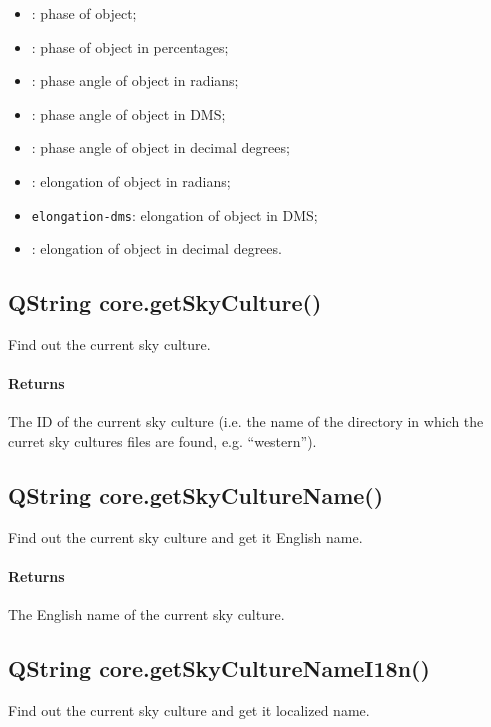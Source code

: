 \begin{itemize}
\item {}: phase of object\footnotemark[2];
\item {}: phase of object in percentages\footnotemark[2];
\item {}: phase angle of object in radians\footnotemark[2];
\item {}: phase angle of object in DMS\footnotemark[2];
\item {}: phase angle of object in decimal degrees\footnotemark[2];
\item {}: elongation of object in radians\footnotemark[2];
\item \texttt{elongation-dms}: elongation of object in DMS\footnotemark[2];
\item {}: elongation of object in decimal degrees\footnotemark[2].
\end{itemize}

\subsection{QString core.getSkyCulture()}
\label{sec:ScriptingAPI:core:getSkyCulture}
Find out the current sky culture.

\paragraph{Returns}
The ID of the current sky culture (i.e. the name of the directory in which the curret sky cultures files are found, e.g. ``western'').

\subsection{QString core.getSkyCultureName()}
\label{sec:ScriptingAPI:core:getSkyCultureName}
Find out the current sky culture and get it English name.

\paragraph{Returns}
The English name of the current sky culture.

\subsection{QString core.getSkyCultureNameI18n()}
\label{sec:ScriptingAPI:core:getSkyCultureNameI18n}
Find out the current sky culture and get it localized name.

